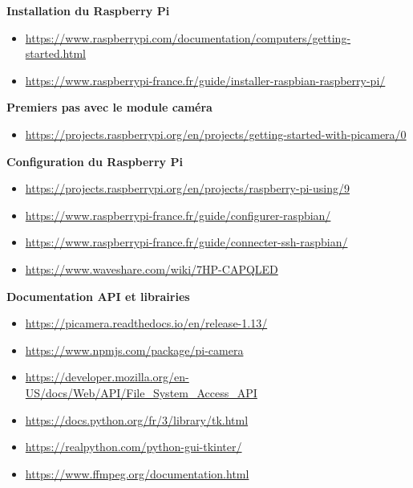 \begin{thebibliography}{9}
    \textbf{Installation du Raspberry Pi}
    \begin{itemize}
        \item \footnotesize{\url{https://www.raspberrypi.com/documentation/computers/getting-started.html}}
        \item \footnotesize{\url{https://www.raspberrypi-france.fr/guide/installer-raspbian-raspberry-pi/}}
    \end{itemize}

    \textbf{Premiers pas avec le module caméra}
    \begin{itemize}
        \item \footnotesize{\url{https://projects.raspberrypi.org/en/projects/getting-started-with-picamera/0}}
    \end{itemize}

    \textbf{Configuration du Raspberry Pi}
    \begin{itemize}
        \item \footnotesize{\url{https://projects.raspberrypi.org/en/projects/raspberry-pi-using/9}}
        \item \footnotesize{\url{https://www.raspberrypi-france.fr/guide/configurer-raspbian/}}
        \item \footnotesize{\url{https://www.raspberrypi-france.fr/guide/connecter-ssh-raspbian/}}
        \item \footnotesize{\url{https://www.waveshare.com/wiki/7HP-CAPQLED}}
    \end{itemize}    

    \textbf{Documentation API et librairies}
    \begin{itemize}
        \item \footnotesize{\url{https://picamera.readthedocs.io/en/release-1.13/}}
        \item \footnotesize{\url{https://www.npmjs.com/package/pi-camera}}
        \item \footnotesize{\url{https://developer.mozilla.org/en-US/docs/Web/API/File_System_Access_API}}
        \item \footnotesize{\url{https://docs.python.org/fr/3/library/tk.html}}
        \item \footnotesize{\url{https://realpython.com/python-gui-tkinter/}}
        \item \footnotesize{\url{https://www.ffmpeg.org/documentation.html}}
    \end{itemize}


\end{thebibliography}
